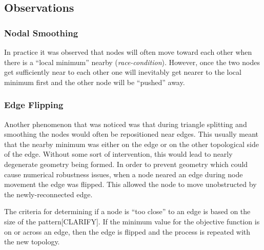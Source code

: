 \subsection{Observations}
\subsubsection{Nodal Smoothing}
In practice it was observed that nodes will often move toward each other
when there is a ``local minimum'' nearby ({\it race-condition}).
However, once the two nodes get sufficiently near to each other one will
inevitably get nearer to the local minimum first and the other node will
be ``pushed'' away.

\subsubsection{Edge Flipping}
Another phenomenon that was noticed was that during triangle splitting
and smoothing the nodes would often be repositioned near edges. This
usually meant that the nearby minimum was either on the edge or on the
other topological side of the edge. Without some sort of intervention,
this would lead to nearly degenerate geometry being formed. In order to
prevent geometry which could cause numerical robustness issues, when a
node neared an edge during node movement the edge was flipped. This
allowed the node to move unobstructed by the newly-reconnected edge.

The criteria for determining if a node is ``too close'' to an edge is
based on the size of the pattern[CLARIFY]. If the minimum value for the
objective function is on or across an edge, then the edge is flipped and
the process is repeated with the new topology.
